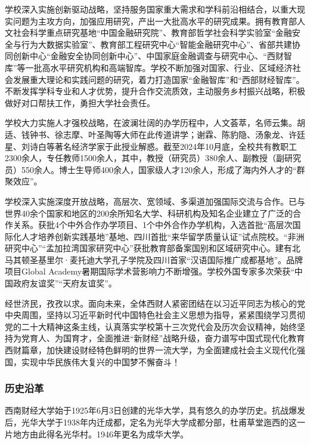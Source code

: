 学校深入实施创新驱动战略，坚持服务国家重大需求和学科前沿相结合，以重大现实问题为主攻方向，加强应用研究，产出一大批高水平的研究成果。拥有教育部人文社会科学重点研究基地“中国金融研究院”、教育部哲学社会科学实验室“金融安全与行为大数据实验室”、教育部工程研究中心“智能金融研究中心”、省部共建协同创新中心“金融安全协同创新中心”、中国家庭金融调查与研究中心、“西财智库”等一批高水平研究机构和高端智库。学校不断加强对国家、行业、区域经济社会发展重大理论和实践问题的研究，着力打造国家“金融智库”和“西部财经智库”。不断发挥学科专业和人才优势，提升合作交流质效，主动服务乡村振兴战略，积极做好对口帮扶工作，勇担大学社会责任。

学校大力实施人才强校战略，在波澜壮阔的办学历程中，人文荟萃，名师云集。胡适、钱钟书、徐志摩、叶圣陶等大师在此传道讲学；谢霖、陈豹隐、汤象龙、许廷星、刘诗白等著名经济学家于此授业解惑。截至2024年10月底，全校共有教职工2300余人，专任教师1500余人，其中，教授（研究员）380余人、副教授（副研究员）550余人。博士生导师400余人，国家级人才120余人，形成了海内外人才的“群聚效应”。

学校深入实施深度开放战略，高层次、宽领域、多渠道加强国际交流与合作。已与世界40余个国家和地区的200余所知名大学、科研机构及知名企业建立了广泛的合作关系。获批4个中外合作办学项目、1个中外合作办学机构，入选首批“高层次国际化人才培养创新实践基地”基地、四川首批“来华留学质量认证”试点院校。“非洲研究中心”“孟加拉湾国家研究中心”获批教育部备案国别和区域研究中心。建有北马其顿圣基里尔·麦托迪大学孔子学院及四川首家“汉语国际推广成都基地”。品牌项目Global Academy暑期国际学术营影响力不断增强。学校外国专家多次荣获“中国政府友谊奖”“天府友谊奖”。

经世济民，孜孜以求。面向未来，全体西财人紧密团结在以习近平同志为核心的党中央周围，坚持以习近平新时代中国特色社会主义思想为指导，紧紧围绕学习贯彻党的二十大精神这条主线，认真落实学校第十三次党代会及历次会议精神，始终坚持为党育人、为国育才，全面推进“新财经”战略升级，奋力谱写中国式现代化教育西财篇章，加快建设财经特色鲜明的世界一流大学，为全面建成社会主义现代化强国，实现中华民族伟大复兴的中国梦不懈奋斗！

\subsubsection{历史沿革}

西南财经大学始于1925年6月3日创建的光华大学，具有悠久的办学历史。抗战爆发后，光华大学于1938年内迁成都，定名为光华大学成都分部，杜甫草堂迤西的这一片地方由此得名光华村。1946年更名为成华大学。

